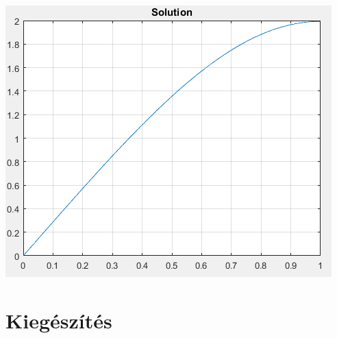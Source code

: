 \documentclass[oneside, titlepage, 12pt, a4paper]{report}
\begin{document}
\begin{center}
	\includegraphics{./abrak/pelda_02.png}
\end{center}


\section{Kiegészítés} %
\end{document}
